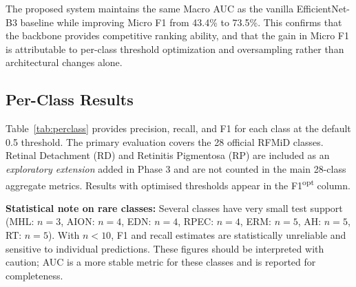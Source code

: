 \documentclass[conference]{IEEEtran}
\begin{document}
The proposed system maintains the same Macro AUC as the vanilla EfficientNet-B3 baseline while improving Micro F1 from 43.4\% to 73.5\%. This confirms that the backbone provides competitive ranking ability, and that the gain in Micro F1 is attributable to per-class threshold optimization and oversampling rather than architectural changes alone.

\subsection{Per-Class Results}
\label{sec:perclass_results}
Table~\ref{tab:perclass} provides precision, recall, and F1 for each class at the default 0.5 threshold. The primary evaluation covers the 28 official RFMiD classes. Retinal Detachment (RD) and Retinitis Pigmentosa (RP) are included as an \emph{exploratory extension} added in Phase 3 and are not counted in the main 28-class aggregate metrics. Results with optimised thresholds appear in the F1\textsuperscript{opt} column.

\textbf{Statistical note on rare classes:} Several classes have very small test support (MHL: $n{=}3$, AION: $n{=}4$, EDN: $n{=}4$, RPEC: $n{=}4$, ERM: $n{=}5$, AH: $n{=}5$, RT: $n{=}5$). With $n < 10$, F1 and recall estimates are statistically unreliable and sensitive to individual predictions. These figures should be interpreted with caution; AUC is a more stable metric for these classes and is reported for completeness.
\end{document}
